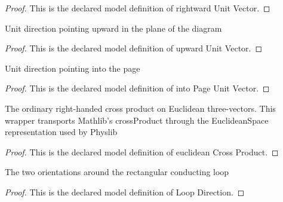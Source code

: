 \begin{proof}
  This is the declared model definition of rightward Unit Vector.
\end{proof}
\begin{definition}
  \label{def:physics:phyx-mini-0918:phyxminiproblems-problemphyxmini0918-upwardunitvector}
  Unit direction pointing upward in the plane of the diagram
\end{definition}
\begin{proof}
  This is the declared model definition of upward Unit Vector.
\end{proof}
\begin{definition}
  \label{def:physics:phyx-mini-0918:phyxminiproblems-problemphyxmini0918-intopageunitvector}
  Unit direction pointing into the page
\end{definition}
\begin{proof}
  This is the declared model definition of into Page Unit Vector.
\end{proof}
\begin{definition}
  \label{def:physics:phyx-mini-0918:phyxminiproblems-problemphyxmini0918-euclideancrossproduct}
  The ordinary right-handed cross product on Euclidean three-vectors. This wrapper transports Mathlib's crossProduct through the EuclideanSpace representation used by Physlib
\end{definition}
\begin{proof}
  This is the declared model definition of euclidean Cross Product.
\end{proof}
\begin{definition}
  \label{def:physics:phyx-mini-0918:phyxminiproblems-problemphyxmini0918-loopdirection}
  The two orientations around the rectangular conducting loop
\end{definition}
\begin{proof}
  This is the declared model definition of Loop Direction.
\end{proof}
